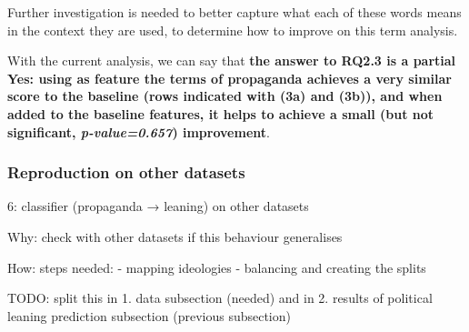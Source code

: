 Further investigation is needed to better capture what each of these words means in the context they are used, to determine how to improve on this term analysis.%

With the current analysis, we can say that \textbf{the answer to RQ2.3 is a partial Yes: using as feature the terms of propaganda achieves a very similar score to the baseline (rows indicated with (3a) and (3b)), and when added to the baseline features, it helps to achieve a small (but not significant, \textit{p-value=0.657}) improvement}. %


\subsubsection{\statusred Reproduction on other datasets}
6: classifier (propaganda → leaning) on other datasets

Why: check with other datasets if this behaviour generalises

How: steps needed:
- mapping ideologies
- balancing and creating the splits

TODO: split this in 
1. data subsection (needed) and in
2. results of political leaning prediction subsection (previous subsection)



